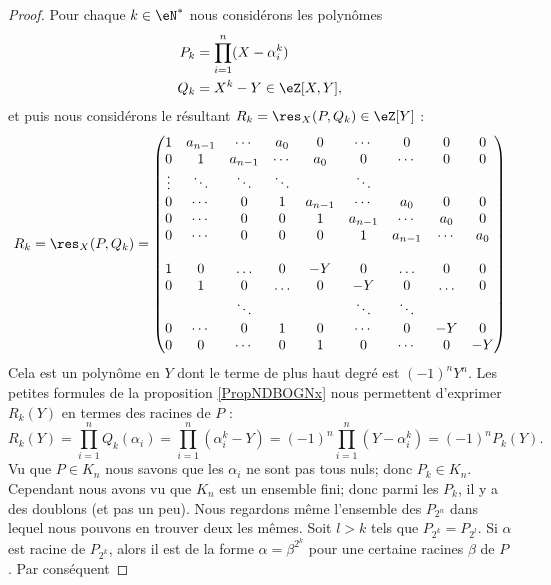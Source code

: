 \begin{proof}
    Pour chaque \( k\in \eN^*\) nous considérons les polynômes
    \begin{subequations}
        \begin{align}
            P_k&=\prod_{i=1}^n(X-\alpha_i^k)\\
            Q_k&=X^k-Y\in \eZ[X,Y],
        \end{align}
    \end{subequations}
    et puis nous considérons le résultant \( R_k=\res_X(P,Q_k)\in \eZ[Y]\) :
    \begin{equation}
        R_k=\res_X(P,Q_k)=
        \begin{pmatrix}
            1&a_{n-1}&\cdots&a_0&0&\cdots&0&0&0\\  
            0&1&a_{n-1}&\cdots&a_0&0&\cdots&0&0\\  
            \vdots&\ddots&\ddots&\ddots&&\ddots&\\  
            0&\cdots&0&1&a_{n-1}&\cdots&a_0&0&0\\
            0&\cdots&0&0&1&a_{n-1}&\cdots&a_0&0\\
            0&\cdots&0&0&0&1&a_{n-1}&\cdots&a_0\\
        \\
                    1&0&\ldots&0&-Y&0&\ldots&0&0\\
                    0&1&0&\ldots&0&-Y&0&\ldots&0\\
                &&\ddots&&&\ddots&\ddots\\
                    0&\cdots&0&1&0&\cdots&0&-Y&0\\
                    0&0&\cdots&0&1&0&\cdots&0&-Y
        \end{pmatrix}
    \end{equation}
    Cela est un polynôme en \( Y\) dont le terme de plus haut degré est \( (-1)^nY^n\). Les petites formules de la proposition \ref{PropNDBOGNx} nous permettent d'exprimer \( R_k(Y)\) en termes des racines de \( P\) :
    \begin{equation}
        R_k(Y)=\prod_{i=1}^nQ_k(\alpha_i)=\prod_{i=1}^n(\alpha_i^k-Y)=(-1)^n\prod_{i=1}^n(Y-\alpha_i^k)=(-1)^nP_k(Y).
    \end{equation}
    Vu que \( P\in K_n\) nous savons que les \( \alpha_i\) ne sont pas tous nuls; donc \( P_k\in K_n\). Cependant nous avons vu que \( K_n\) est un ensemble fini; donc parmi les \( P_k\), il y a des doublons (et pas un peu). Nous regardons même l'ensemble des \( P_{2^n}\) dans lequel nous pouvons en trouver deux les mêmes. Soit \( l>k\) tels que \( P_{2^k}=P_{2^l}\). Si \( \alpha\) est racine de \( P_{2^k}\), alors il est de la forme \( \alpha=\beta^{2^k}\) pour une certaine racines \( \beta\) de \( P\). Par conséquent

\end{proof}
